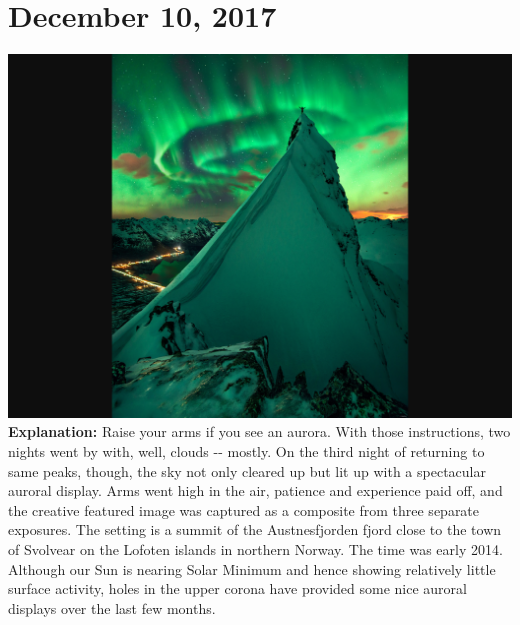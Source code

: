\documentclass{article}%
\begin{document}
\section*{December 10, 2017}%
\includegraphics[width=\textwidth]{../lib/pictures/171210.jpg}%
\textbf{\newline%
\newline%
Explanation:\newline%
}%
     Raise your arms if you see an aurora.  With those instructions, two nights went by with, well, clouds {-}{-} mostly.  On the third night of returning to same peaks, though, the sky not only cleared up but lit up with a  spectacular auroral display.  Arms went high in the air, patience and experience paid off,  and the creative featured image was captured as a composite from three separate exposures.  The setting is a summit of the  Austnesfjorden  fjord close to the town of  Svolvear on the  Lofoten islands in northern Norway.  The time was early 2014.  Although our  Sun is nearing  Solar Minimum and hence showing relatively little surface activity,  holes in the upper corona have provided some nice  auroral displays over the last few months.%
\newpage

%
\end{document}

